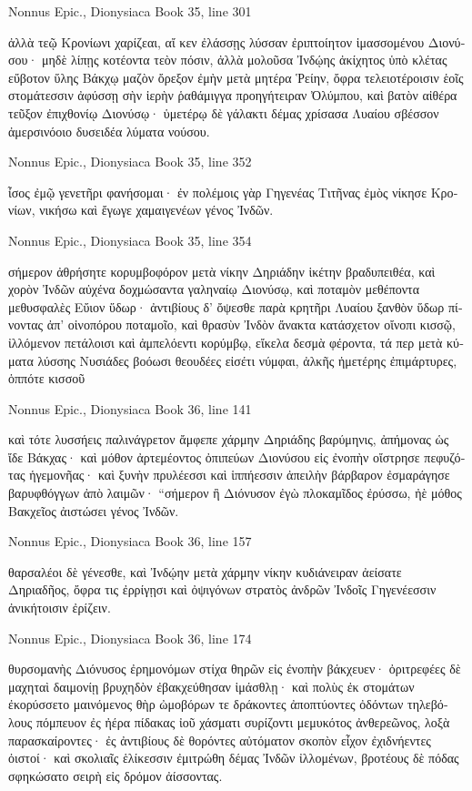 \documentclass[12pt,letterpaper,twoside,final]{memoir}
\begin{document}
\begin{greek}
Nonnus Epic., Dionysiaca 
Book 35, line 301

ἀλλὰ τεῷ Κρονίωνι χαρίζεαι, αἴ κεν ἐλάσσῃς 
λύσσαν ἐριπτοίητον ἱμασσομένου Διονύσου· 
μηδὲ λίπῃς κοτέοντα τεὸν πόσιν, ἀλλὰ μολοῦσα 
Ἰνδῴης ἀκίχητος ὑπὸ κλέτας εὔβοτον ὕλης 
Βάκχῳ μαζὸν ὄρεξον ἐμὴν μετὰ μητέρα Ῥείην, 
ὄφρα τελειοτέροισιν ἑοῖς στομάτεσσιν ἀφύσσῃ 
σὴν ἱερὴν ῥαθάμιγγα προηγήτειραν Ὀλύμπου, 
καὶ βατὸν αἰθέρα τεῦξον ἐπιχθονίῳ Διονύσῳ· 
ὑμετέρῳ δὲ γάλακτι δέμας χρίσασα Λυαίου 
σβέσσον ἀμερσινόοιο δυσειδέα λύματα νούσου. 



Nonnus Epic., Dionysiaca 
Book 35, line 352

ἶσος ἐμῷ γενετῆρι φανήσομαι· ἐν πολέμοις γὰρ 
Γηγενέας Τιτῆνας ἐμὸς νίκησε Κρονίων, 
νικήσω καὶ ἔγωγε χαμαιγενέων γένος Ἰνδῶν. 



Nonnus Epic., Dionysiaca 
Book 35, line 354

σήμερον ἀθρήσητε κορυμβοφόρον μετὰ νίκην 
Δηριάδην ἱκέτην βραδυπειθέα, καὶ χορὸν Ἰνδῶν 
αὐχένα δοχμώσαντα γαληναίῳ Διονύσῳ, 
καὶ ποταμὸν μεθέποντα μεθυσφαλὲς Εὔιον ὕδωρ· 
ἀντιβίους δ' ὄψεσθε παρὰ κρητῆρι Λυαίου 
ξανθὸν ὕδωρ πίνοντας ἀπ' οἰνοπόρου ποταμοῖο, 
καὶ θρασὺν Ἰνδὸν ἄνακτα κατάσχετον οἴνοπι κισσῷ, 
ἰλλόμενον πετάλοισι καὶ ἀμπελόεντι κορύμβῳ, 
εἴκελα δεσμὰ φέροντα, τά περ μετὰ κύματα λύσσης 
Νυσιάδες βοόωσι θεουδέες εἰσέτι νύμφαι, 
ἀλκῆς ἡμετέρης ἐπιμάρτυρες, ὁππότε κισσοῦ 




Nonnus Epic., Dionysiaca 
Book 36, line 141

καὶ τότε λυσσήεις παλινάγρετον ἄμφεπε χάρμην   
Δηριάδης βαρύμηνις, ἀπήμονας ὡς ἴδε Βάκχας· 
καὶ μόθον ἀρτεμέοντος ὀπιπεύων Διονύσου 
εἰς ἐνοπὴν οἴστρησε πεφυζότας ἡγεμονῆας· 
καὶ ξυνὴν πρυλέεσσι καὶ ἱππήεσσιν ἀπειλὴν 
βάρβαρον ἐσμαράγησε βαρυφθόγγων ἀπὸ λαιμῶν· 
 “σήμερον ἢ Διόνυσον ἐγὼ πλοκαμῖδος ἐρύσσω, 
ἠὲ μόθος Βακχεῖος ἀιστώσει γένος Ἰνδῶν. 



Nonnus Epic., Dionysiaca 
Book 36, line 157

θαρσαλέοι δὲ γένεσθε, καὶ Ἰνδῴην μετὰ χάρμην 
νίκην κυδιάνειραν ἀείσατε Δηριαδῆος,   
ὄφρα τις ἐρρίγῃσι καὶ ὀψιγόνων στρατὸς ἀνδρῶν 
Ἰνδοῖς Γηγενέεσσιν ἀνικήτοισιν ἐρίζειν. 



Nonnus Epic., Dionysiaca 
Book 36, line 174

θυρσομανὴς Διόνυσος ἐρημονόμων στίχα θηρῶν 
εἰς ἐνοπὴν βάκχευεν· ὀριτρεφέες δὲ μαχηταὶ 
δαιμονίῃ βρυχηδὸν ἐβακχεύθησαν ἱμάσθλῃ· 
καὶ πολὺς ἐκ στομάτων ἐκορύσσετο μαινόμενος θὴρ 
ὠμοβόρων τε δράκοντες ἀποπτύοντες ὀδόντων 
τηλεβόλους πόμπευον ἐς ἠέρα πίδακας ἰοῦ 
χάσματι συρίζοντι μεμυκότος ἀνθερεῶνος, 
λοξὰ παρασκαίροντες· ἐς ἀντιβίους δὲ θορόντες 
αὐτόματον σκοπὸν εἶχον ἐχιδνήεντες ὀιστοί· 
καὶ σκολιαῖς ἑλίκεσσιν ἐμιτρώθη δέμας Ἰνδῶν 
ἰλλομένων, βροτέους δὲ πόδας σφηκώσατο σειρὴ 
εἰς δρόμον ἀίσσοντας. 




\end{greek}
\end{document}
